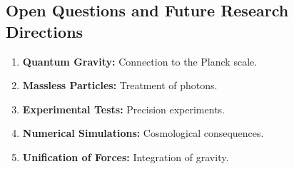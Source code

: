 \documentclass[a4paper,12pt]{article}
\begin{document}
	\subsection{Open Questions and Future Research Directions}
	
	\begin{enumerate}
		\item \textbf{Quantum Gravity:} Connection to the Planck scale.
		\item \textbf{Massless Particles:} Treatment of photons.
		\item \textbf{Experimental Tests:} Precision experiments.
		\item \textbf{Numerical Simulations:} Cosmological consequences.
		\item \textbf{Unification of Forces:} Integration of gravity.
	\end{enumerate}
	
\end{document}
